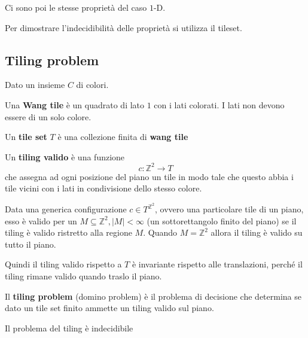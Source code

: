Ci sono poi le stesse proprietà del caso $1$-D.

Per dimostrare l'indecidibilità delle proprietà si utilizza il tileset.
\subsection{Tiling problem }
Dato un insieme $C$ di colori.

\begin{definizione} 
    Una \textbf{Wang tile} è un quadrato di lato $1$ con i lati colorati. 
    I lati non devono essere di un solo colore.
\end{definizione}

\begin{definizione} 
    Un  \textbf{tile set} $T$ è una collezione finita di \textbf{wang tile}
\end{definizione}

\begin{definizione} 
    Un  \textbf{tiling valido} è una funzione 
    $$c: \mathbb{Z}^2\rightarrow T$$
    che assegna ad ogni posizione del piano un tile in modo tale che questo abbia
    i tile vicini con i lati in condivisione dello stesso colore.
\end{definizione}

Data una generica configurazione $c\in T^{\mathbb{Z}^2}$, ovvero una particolare 
tile di un piano, esso è valido per un $M\subseteq \mathbb{Z}^2, |M|<\infty$ (un sottorettangolo finito
del piano) se il tiling è valido ristretto alla regione $M$. Quando $M=\mathbb{Z}^2$ 
allora il tiling è valido su tutto il piano.

Quindi il tiling valido rispetto a $T$ è invariante rispetto alle translazioni,
perché il tiling rimane valido quando traslo il piano.

\begin{definizione} 
    Il \textbf{tiling problem} (domino problem) è il problema di decisione che determina se dato un 
    tile set finito ammette un tiling valido sul piano.
\end{definizione}

\begin{teorema}
    Il problema del tiling è indecidibile
\end{teorema}


